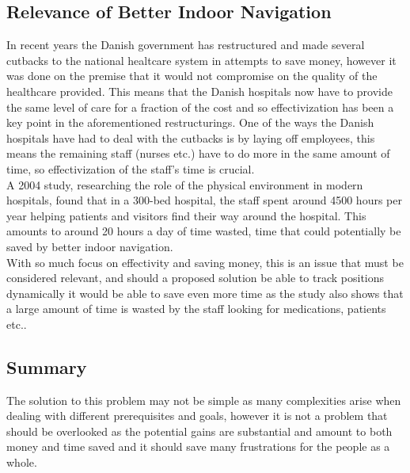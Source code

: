 \subsection{Relevance of Better Indoor Navigation}
In recent years the Danish government has restructured and made several cutbacks to the national healtcare system in attempts to save money\cite{cutback_danNHS}, however it was done on the premise that it would not compromise on the quality of the healthcare provided. This means that the Danish hospitals now have to provide the same level of care for a fraction of the cost and so effectivization has been a key point in the aforementioned restructurings. One of the ways the Danish hospitals have had to deal with the cutbacks is by laying off employees\cite{cutback_firing}, this means the remaining staff (nurses etc.) have to do more in the same amount of time, so effectivization of the staff's time is crucial.\\
A 2004 study\cite{twaste_2004}, researching the role of the physical environment in modern hospitals, found that in a 300-bed hospital, the staff spent around 4500 hours per year helping patients and visitors find their way around the hospital. This amounts to around 20 hours a day of time wasted, time that could potentially be saved by better indoor navigation.\\
With so much focus on effectivity and saving money, this is an issue that must be considered relevant, and should a proposed solution be able to track positions dynamically it would be able to save even more time as the study also shows that a large amount of time is wasted by the staff looking for medications, patients etc..

\subsection{Summary}
The solution to this problem may not be simple as many complexities arise when dealing with different prerequisites and goals, however it is not a problem that should be overlooked as the potential gains are substantial and amount to both money and time saved and it should save many frustrations for the people as a whole.